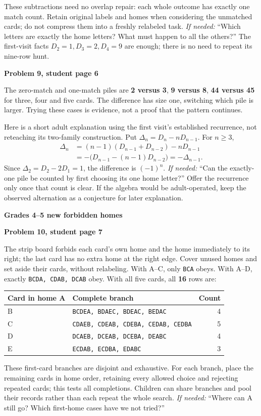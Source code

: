\documentclass[11pt]{article}
\newcommand{\head}[1]{\par\textbf{\large #1}\par}
\newcommand{\sub}[1]{\par\textbf{#1}\par}
\newcommand{\row}[1]{\texttt{#1}}
\newcommand{\hint}[1]{\emph{If needed:} #1}
\begin{document}
These subtractions need no overlap repair: each whole outcome has exactly one match count. Retain original labels and homes when considering the unmatched cards; do not compress them into a freshly relabeled task. \hint{``Which letters are exactly the home letters? What must happen to all the others?''} The first-visit facts $D_2=1,D_3=2,D_4=9$ are enough; there is no need to repeat its nine-row hunt.

\sub{Problem 9, student page 6}
The zero-match and one-match piles are \textbf{2 versus 3}, \textbf{9 versus 8}, \textbf{44 versus 45} for three, four and five cards. The difference has size one, switching which pile is larger. Trying these cases is evidence, not a proof that the pattern continues.

Here is a short adult explanation using the first visit's established recurrence, not reteaching its two-family construction. Put $\Delta_n=D_n-nD_{n-1}$. For $n\ge3$,
\[
\begin{aligned}
\Delta_n
&=(n-1)(D_{n-1}+D_{n-2})-nD_{n-1}\\
&=-\bigl(D_{n-1}-(n-1)D_{n-2}\bigr)=-\Delta_{n-1}.
\end{aligned}
\]
Since $\Delta_2=D_2-2D_1=1$, the difference is $(-1)^n$. \hint{``Can the exactly-one pile be counted by first choosing its one home letter?''} Offer the recurrence only once that count is clear. If the algebra would be adult-operated, keep the observed alternation as a conjecture for later explanation.
\newpage
\head{Grades 4--5 new forbidden homes}
\sub{Problem 10, student page 7}
The strip board forbids each card's own home and the home immediately to its right; the last card has no extra home at the right edge. Cover unused homes and set aside their cards, without relabeling. With A--C, only \row{BCA} obeys. With A--D, exactly \row{BCDA, CDAB, DCAB} obey. With all five cards, all \textbf{16} rows are:
\begin{center}\small
\begin{tabular}{llr}
Card in home A & Complete branch & Count\\\midrule
B & \row{BCDEA, BDAEC, BDEAC, BEDAC} & 4\\
C & \row{CDAEB, CDEAB, CDEBA, CEDAB, CEDBA} & 5\\
D & \row{DCAEB, DCEAB, DCEBA, DEABC} & 4\\
E & \row{ECDAB, ECDBA, EDABC} & 3
\end{tabular}
\end{center}
These first-card branches are disjoint and exhaustive. For each branch, place the remaining cards in home order, retaining every allowed choice and rejecting repeated cards; this tests all completions. Children can share branches and pool their records rather than each repeat the whole search. \hint{``Where can A still go? Which first-home cases have we not tried?''}
\end{document}

